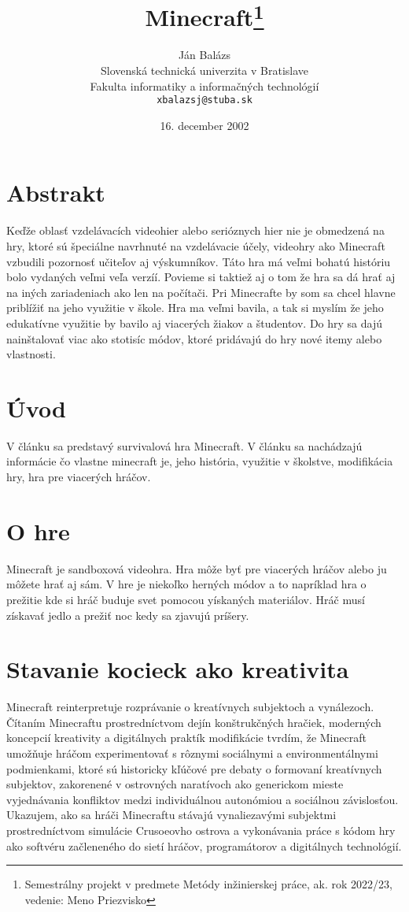 \documentclass[10pt,twoside,slovak,a4paper]{article}
\title{Minecraft\thanks{Semestrálny projekt v predmete Metódy inžinierskej práce, ak. rok 2022/23, vedenie: Meno Priezvisko}} %
\author{Ján Balázs\\[2pt]
	{\small Slovenská technická univerzita v Bratislave}\\
	{\small Fakulta informatiky a informačných technológií}\\
	{\small \texttt{xbalazsj@stuba.sk}}
	}
\date{\small 16. december 2002} %
\begin{document}
\maketitle

\section{Abstrakt}

Keďže oblasť vzdelávacích videohier alebo serióznych hier nie je
obmedzená na hry, ktoré sú špeciálne navrhnuté na vzdelávacie účely,
videohry ako Minecraft vzbudili pozornosť učiteľov aj výskumníkov. Táto hra
má veľmi bohatú históriu bolo vydaných veľmi veľa verzíí. Povieme si taktiež
aj o tom že hra sa dá hrať aj na iných zariadeniach ako len na počítači.
Pri Minecrafte by som sa chcel hlavne priblížiť na jeho využitie v škole. Hra
ma veľmi bavila, a tak si myslím že jeho edukatívne využitie by bavilo aj
viacerých žiakov a študentov. Do hry sa dajú nainštalovať viac ako stotisíc
módov, ktoré pridávajú do hry nové itemy alebo vlastnosti.

\section{Úvod}

V článku sa predstavý survivalová hra Minecraft. V článku sa nachádzajú informácie čo vlastne minecraft je, jeho história, využitie v školstve, modifikácia hry, hra pre viacerých hráčov.



\section{O hre} 

Minecraft je sandboxová videohra. Hra môže byť pre viacerých hráčov alebo ju môžete hrať aj sám. V hre je niekoľko herných módov a to napríklad hra o prežitie kde si hráč buduje svet pomocou yískaných materiálov. Hráč musí získavať jedlo a prežiť noc kedy sa zjavujú príšery.

\section{Stavanie kocieck ako kreativita} 

Minecraft reinterpretuje rozprávanie o kreatívnych subjektoch a vynálezoch. Čítaním Minecraftu prostredníctvom dejín konštrukčných hračiek, moderných koncepcií kreativity a digitálnych praktík modifikácie tvrdím, že Minecraft umožňuje hráčom experimentovať s rôznymi sociálnymi a environmentálnymi podmienkami, ktoré sú historicky kľúčové pre debaty o formovaní kreatívnych subjektov, zakorenené v ostrovných naratívoch ako generickom mieste vyjednávania konfliktov medzi individuálnou autonómiou a sociálnou závislosťou. Ukazujem, ako sa hráči Minecraftu stávajú vynaliezavými subjektmi prostredníctvom simulácie Crusoeovho ostrova a vykonávania práce s kódom hry ako softvéru začleneného do sietí hráčov, programátorov a digitálnych technológií.
\end{document}
